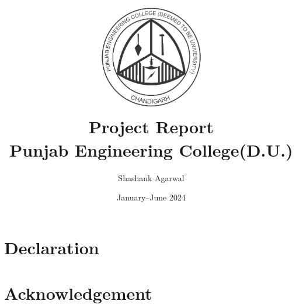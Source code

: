 \documentclass[12pt]{report}
\title{
    {\includegraphics{university.png}}\\
    {Project Report}\\
    {\large Punjab Engineering College(D.U.)}
    }
\date{January--June 2024}
\author{Shashank Agarwal}
\begin{document}


\chapter*{Declaration}

\chapter*{Acknowledgement}

\tableofcontents
\end{document}
